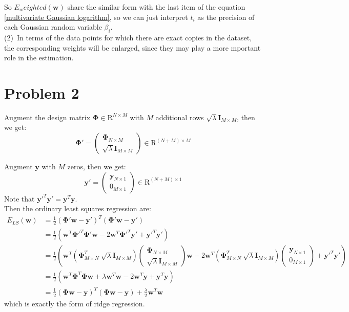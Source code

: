 \documentclass{article}
\begin{document}
So $E_weighted(\bm{w})$ share the similar form with the last item of the equation \ref{multivariate Gaussian logarithm}, so we can just interpret $t_i$ as the precision of each Gaussian random variable $\beta_i$.\\
(2)\ In terms of the data points for which there are exact copies in the dataset, the corresponding weights will be enlarged, since they may play a more mportant role in the estimation.


\section*{Problem 2}
Augment the design matrix $\bm{\Phi} \in \mathrm{R}^{N\times M}$ with $M$ additional rows $\sqrt{\lambda}\bm{I}_{M\times M}$, then we get:
\begin{equation}
\bm{\Phi'} = 
\begin{pmatrix}
\bm{\Phi}_{N \times M} \\
\sqrt{\lambda}\bm{I}_{M\times M}
\end{pmatrix} \in \mathrm{R}^{(N+M)\times M}
\end{equation}

Augment $\bm{y}$ with $M$ zeros, then we get:
\begin{equation}
\bm{y}'= 
\begin{pmatrix}
\bm{y}_{N\times 1} \\ 0_{M\times 1}
\end{pmatrix} \in \mathrm{R}^{(N+M)\times 1}
\end{equation}
Note that $\bm{y'}^T\bm{y'} = \bm{y}^T\bm{y}$.\\
Then the ordinary least squares regression are:
\begin{equation}
\begin{aligned}
E_{LS}(\bm{w})
&= \frac{1}{2}(\bm{\Phi' w} -\bm{y}')^T(\bm{\Phi' w} -\bm{y}')\\
&= \frac{1}{2}(\bm{w}^T\bm{\Phi}'^T\bm{\Phi' w} - 2\bm{w}^T\bm{\Phi}'^T\bm{y}' + \bm{y}'^T\bm{y}')\\
&= \frac{1}{2}(\bm{w}^T(\bm{\Phi}^T_{M\times N} \ \sqrt{\lambda}\bm{I}_{M\times M})
\begin{pmatrix}
\bm{\Phi}_{N \times M} \\
\sqrt{\lambda}\bm{I}_{M\times M}
\end{pmatrix}
\bm{w} - 2\bm{w}^T(\bm{\Phi}^T_{M\times N} \ \sqrt{\lambda}\bm{I}_{M\times M})
\begin{pmatrix}
\bm{y}_{N\times 1} \\ 0_{M\times 1}
\end{pmatrix}
+\bm{y}'^T\bm{y}')\\
&= \frac{1}{2}(\bm{w}^T\bm{\Phi}^T\bm{\Phi}\bm{w}+\lambda\bm{w}^T\bm{w}-2\bm{w}^T\bm{y}+\bm{y}^T\bm{y})\\
&= \frac{1}{2}(\bm{\Phi}\bm{w}-\bm{y})^T(\bm{\Phi}\bm{w}-\bm{y})+\frac{\lambda}{2}\bm{w}^T\bm{w}
\end{aligned}
\end{equation}
which is exactly the form of ridge regression.
\end{document}

